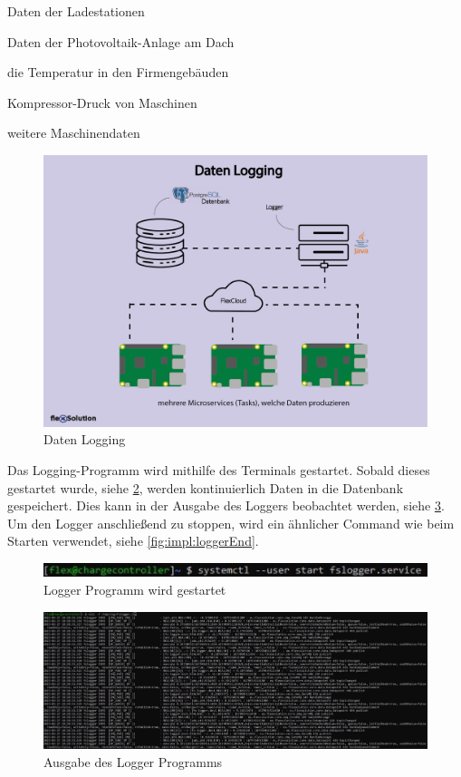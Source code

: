 \begin{compactitem}
    \item Daten der Ladestationen
    \item Daten der Photovoltaik-Anlage am Dach
    \item die Temperatur in den Firmengebäuden
    \item Kompressor-Druck von Maschinen
    \item weitere Maschinendaten
\end{compactitem}

\begin{figure}[h t]
    \centering
    \includegraphics[scale=0.7]{pics/datenlogging.png}
    \caption{Daten Logging}
    \label{fig:impl:datenlogging}
\end{figure}

Das Logging-Programm wird mithilfe des Terminals gestartet. Sobald dieses gestartet wurde, siehe \ref{fig:impl:loggerStart}, werden kontinuierlich Daten in die Datenbank gespeichert. Dies kann in der Ausgabe des Loggers beobachtet werden, siehe \ref{fig:impl:loggerLog}. Um den Logger anschließend zu stoppen, wird ein ähnlicher Command wie beim Starten verwendet, siehe \ref{fig:impl:loggerEnd}.

\begin{figure}[h t]
    \centering
    \includegraphics[scale=1.3]{pics/loggerStart.JPG}
    \caption{Logger Programm wird gestartet}
    \label{fig:impl:loggerStart}
\end{figure}

\begin{figure}[h t]
    \centering
    \includegraphics[scale=0.4]{pics/loggerLog.JPG}
    \caption{Ausgabe des Logger Programms}
    \label{fig:impl:loggerLog}
\end{figure}

